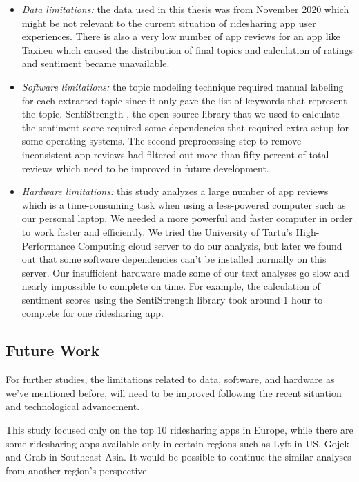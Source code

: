 \documentclass[12pt]{article}
\begin{document}
\begin{itemize}
    \item \emph{Data limitations:} the data used in this thesis was from November 2020 which might be not relevant to the current situation of ridesharing app user experiences. There is also a very low number of app reviews for an app like Taxi.eu which caused the distribution of final topics and calculation of ratings and sentiment became unavailable.
    \item \emph{Software limitations:} the topic modeling technique required manual labeling for each extracted topic since it only gave the list of keywords that represent the topic. SentiStrength \cite{sentistrength}, the open-source library that we used to calculate the sentiment score required some dependencies that required extra setup for some operating systems. The second preprocessing step to remove inconsistent app reviews had filtered out more than fifty percent of total reviews which need to be improved in future development.
    \item \emph{Hardware limitations:} this study analyzes a large number of app reviews which is a time-consuming task when using a less-powered computer such as our personal laptop. We needed a more powerful and faster computer in order to work faster and efficiently. We tried the University of Tartu’s High-Performance Computing cloud server to do our analysis, but later we found out that some software dependencies can’t be installed normally on this server. Our insufficient hardware made some of our text analyses go slow and nearly impossible to complete on time. For example, the calculation of sentiment scores using the SentiStrength library took around 1 hour to complete for one ridesharing app.
\end{itemize}

\subsection{Future Work}
For further studies, the limitations related to data, software, and hardware as we’ve mentioned before, will need to be improved following the recent situation and technological advancement.

This study focused only on the top 10 ridesharing apps in Europe, while there are some ridesharing apps available only in certain regions such as Lyft in US, Gojek and Grab in Southeast Asia. It would be possible to continue the similar analyses from another region’s perspective.
\end{document}
